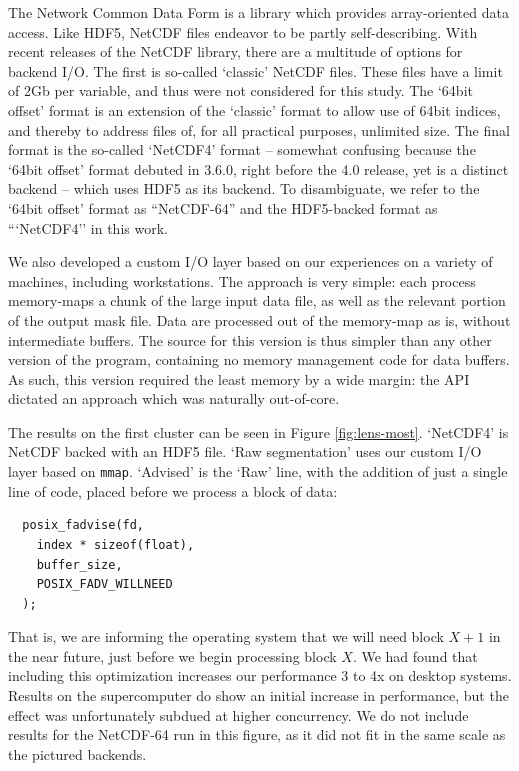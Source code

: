 The Network Common Data Form is a library which provides array-oriented
data access.  Like HDF5, NetCDF files endeavor to be partly
self-describing.  With recent releases of the NetCDF library, there
are a multitude of options for backend I/O.  The first is so-called
`classic' NetCDF files.  These files have a limit of 2Gb per variable,
and thus were not considered for this study.  The `64bit offset' format
is an extension of the `classic' format to allow use of 64bit indices,
and thereby to address files of, for all practical purposes, unlimited
size.  The final format is the so-called `NetCDF4' format -- somewhat
confusing because the `64bit offset' format debuted in 3.6.0, right
before the 4.0 release, yet is a distinct backend -- which uses HDF5 as
its backend.  To disambiguate, we refer to the `64bit offset' format as
``NetCDF-64'' and the HDF5-backed format as ```NetCDF4'' in this work.

We also developed a custom I/O layer based on our experiences on a
variety of machines, including workstations.  The approach is very
simple: each process memory-maps a chunk of the large input data file,
as well as the relevant portion of the output mask file.  Data are
processed out of the memory-map as is, without intermediate buffers.
The source for this version is thus simpler than any other version of
the program, containing no memory management code for data buffers.  As
such, this version required the least memory by a wide margin: the API
dictated an approach which was naturally out-of-core.

The results on the first cluster can be seen in Figure
\ref{fig:lens-most}.  `NetCDF4' is NetCDF backed with an HDF5 file.
`Raw segmentation' uses our custom I/O layer based on \texttt{mmap}.
`Advised' is the `Raw' line, with the addition of just a single line of
code, placed before we process a block of data:
\begin{verbatim}
  posix_fadvise(fd,
    index * sizeof(float),
    buffer_size,
    POSIX_FADV_WILLNEED
  );
\end{verbatim} That is, we are informing the operating system that
we will need block $X+1$ in the near future, just before we begin
processing block $X$.  We had found that including this optimization
increases our performance 3 to 4x on desktop systems.  Results on the
supercomputer do show an initial increase in performance, but the
effect was unfortunately subdued at higher concurrency.  We do not
include results for the NetCDF-64 run in this figure, as it did not fit
in the same scale as the pictured backends.

